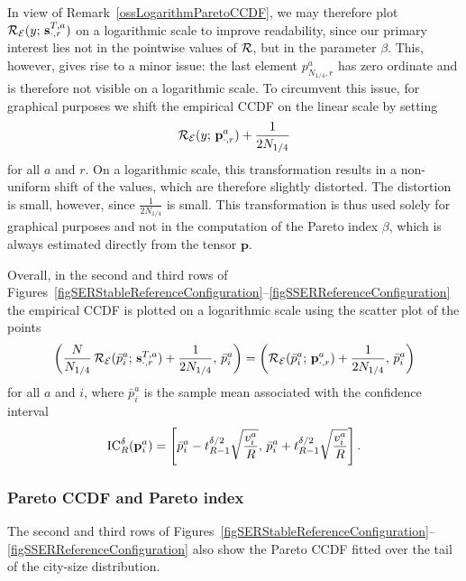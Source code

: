 \documentclass[a4paper]{article}
\begin{document}
In view of Remark~\ref{ossLogarithmParetoCCDF}, we may therefore plot $\operatorname{\mathcal R}_{\mathcal E}(y;\,\mathbf s^{T,a}_{\cdot,r})$ on a logarithmic scale to improve readability, since our primary interest lies not in the pointwise values of $\operatorname{\mathcal R}$, but in the parameter $\beta$. This, however, gives rise to a minor issue: the last element $p^a_{N_{1/4},r}$ has zero ordinate and is therefore not visible on a logarithmic scale. To circumvent this issue, for graphical purposes we shift the empirical CCDF on the linear scale by setting
$$ \operatorname{\mathcal R}_{\mathcal E}(y;\,\mathbf p^a_{\cdot,r})+\frac{1}{2N_{1/4}} $$
for all $a$ and $r$. On a logarithmic scale, this transformation results in a non-uniform shift of the values, which are therefore slightly distorted. The distortion is small, however, since $\frac{1}{2N_{1/4}}$ is small. This transformation is thus used solely for graphical purposes and not in the computation of the Pareto index $\beta$, which is always estimated directly from the tensor $\mathbf p$.

Overall, in the second and third rows of Figures~\ref{figSERStableReferenceConfiguration}--\ref{figSSERReferenceConfiguration} the empirical CCDF is plotted on a logarithmic scale using the scatter plot of the points
$$ \left(\frac{N}{N_{1/4}}\operatorname{\mathcal R}_{\mathcal E}(\bar{p}^a_i;\,\mathbf s^{T,a}_{\cdot,r})+\frac{1}{2N_{1/4}},\,\bar{p}^a_i\right)
    =\left(\operatorname{\mathcal R}_{\mathcal E}(\bar{p}^a_i;\,\mathbf p^a_{\cdot,r})+\frac{1}{2N_{1/4}},\,\bar{p}^a_i\right) $$
for all $a$ and $i$, where $\bar{p}^a_i$ is the sample mean associated with the confidence interval
$$  \operatorname{IC}_R^{\delta}(\mathbf p^a_i)=\left[\bar{p}^a_i-t^{\delta/2}_{R-1}\sqrt{\frac{v^a_i}{R}},\,\bar{p}^a_i+t^{\delta/2}_{R-1}\sqrt{\frac{v^a_i}{R}}\right]. $$

\subsubsection{Pareto CCDF and Pareto index}
\label{secParetoCCDF}
%
The second and third rows of Figures~\ref{figSERStableReferenceConfiguration}--\ref{figSSERReferenceConfiguration} also show the Pareto CCDF fitted over the tail of the city-size distribution.
\end{document}
